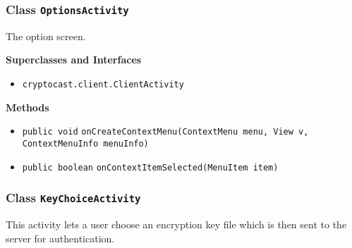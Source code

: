 \subsubsection{Class \lstinline|OptionsActivity|}
The option screen. \\
\noindent\begin{minipage}[t]{5cm}
\vspace{0.3em}
\hspace*{2em}
\vspace{0.3em}
\end{minipage}



\textbf{\sffamily Superclasses and Interfaces}
\begin{itemize}
\item \lstinline|cryptocast.client.ClientActivity|
\end{itemize}



\textbf{\sffamily Methods}
\begin{itemize}
\item \lstinline|public void| \lstinline|onCreateContextMenu|\lstinline|(ContextMenu menu, View v, ContextMenuInfo menuInfo)| \\[-0.6em]




\item \lstinline|public boolean| \lstinline|onContextItemSelected|\lstinline|(MenuItem item)| \\[-0.6em]




\end{itemize}

\subsubsection{Class \lstinline|KeyChoiceActivity|}
This activity lets a user choose an encryption key file
 which is then sent to the server for authentication. \\
\noindent\begin{minipage}[t]{5cm}
\vspace{0.3em}
\hspace*{2em}
\vspace{0.3em}
\end{minipage}



